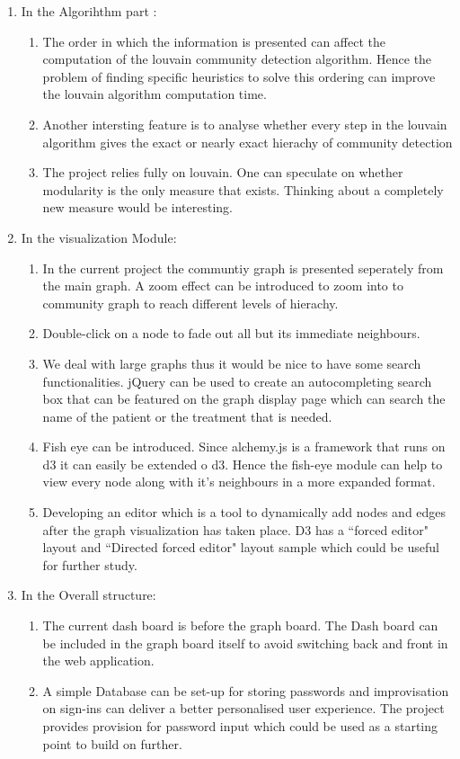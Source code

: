 \begin{enumerate}
\item In the Algorihthm part :
\begin{enumerate}
\item The order in which the information is presented can affect the computation of the louvain community detection algorithm. Hence the problem of finding specific heuristics to solve this ordering can improve the louvain algorithm computation time.
\item Another intersting feature is to analyse whether every step in the louvain algorithm gives the exact or nearly exact hierachy of community detection
\item 
The project relies fully on louvain. One can speculate on whether modularity is the only measure that exists. Thinking about a completely new measure would be interesting. 
\end{enumerate}

\item In the visualization Module:
\begin{enumerate}
\item In the current project the communtiy graph is presented seperately from the main graph.  A zoom effect can be introduced to zoom into to community graph to reach different levels of hierachy. 
\item  Double-click on a node to fade out all but its immediate neighbours.
\item We deal with large graphs thus it would be nice to have some search functionalities. jQuery can be used to create an autocompleting search box that can be featured on the graph display page which can search the name of the patient or the treatment that is needed. 
\item Fish eye can be introduced. Since alchemy.js is a framework that runs on d3 it can easily be extended o d3. Hence the fish-eye module can help to view every node along  with it's neighbours in a more expanded format.
\item Developing an editor which is a tool to dynamically add nodes and edges after the graph visualization has taken place. D3 has a ``forced editor" layout and ``Directed forced editor" layout sample which could be useful for further study.
\end{enumerate}
\item In the Overall structure:
\begin{enumerate}
\item The current dash board is before the graph board. The Dash board can be included in the graph board itself to avoid switching back and front in the web application.
\item  A simple Database can be set-up for storing passwords and improvisation on sign-ins can deliver a better personalised user experience. The project provides provision for password input which could be used as a starting point to build on further. 
\end{enumerate}
\end{enumerate}

